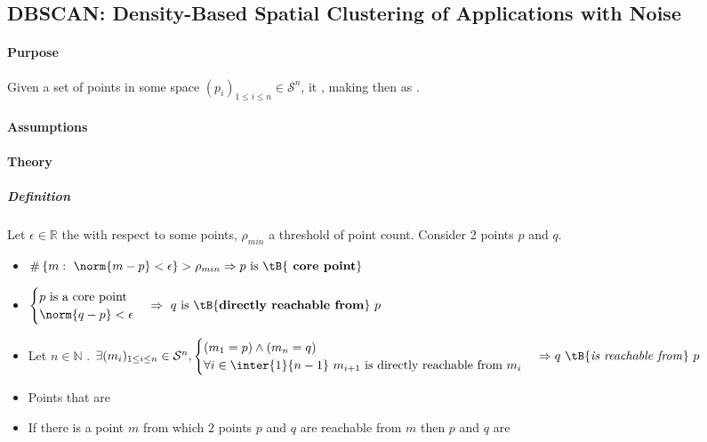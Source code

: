 \subsection{DBSCAN: Density-Based Spatial Clustering of Applications with Noise}
\paragraph{Purpose}
Given a set of points in some space $(p_{i})_{1\leq i\leq n}\in\mathcal{S}^{n}$, it , making then as .
\paragraph{Assumptions}
\paragraph{Theory}
\subparagraph{Definition}
Let $\epsilon\in\mathbb{R}$ the  with respect to some points, 
$\rho_{min}$ a threshold of point count. Consider 2 points $p$ and $q$.
\begin{itemize}
    \item $\#\left\{m:~\norm{m-p}<\epsilon\right\} > \rho_{min} \Rightarrow p\text{ is \tB{\textbf{
                    core point}}}$
    \item 
        $\begin{cases}
            p\text{ is a core point} \\
            \norm{q-p} < \epsilon
        \end{cases} \Rightarrow~q\text{ is \tB{\textbf{directly reachable from}} } p$
    \item Let $n\in\mathbb{N}$ .
$\exists (m_{i})_{1\leq i\leq n}\in\mathcal{S}^{n},
        \begin{cases}
            (m_{1} = p) \wedge (m_{n} = q)\\
            \forall i\in\inter{1}{n-1}~m_{i+1}\text{ is directly reachable from }m_{i}
        \end{cases}\Rightarrow q\text{ \tB{\emph{is reachable from}} } p$
    \item Points that are 
    \item If there is a point $m$ from which 2 points $p$ and $q$ are reachable from $m$ then $p$ and
        $q$ are 
\end{itemize}
